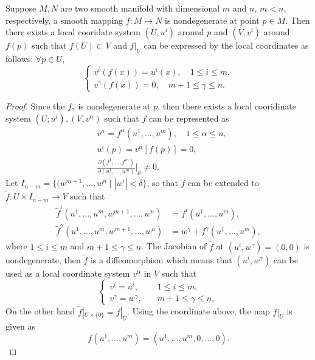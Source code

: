 \begin{theorem}
Suppose $M,N$ are two smooth manifold with dimensional $m$ and $n$, $m<n$, respectively, a smooth mapping $f:M\to N$ is nondegenerate at point $p\in M$. Then there exists a local cooridate system $(U,u^i)$ around $p$ and $(V,v^i)$ around $f(p)$ such that $f(U)\subset V$ and $f|_U$ can be expressed by the local coordinates as follows: $\forall p \in U$,
\begin{equation}
\left\{
\begin{array}{l}
v^i(f(x))=u^i(x),\quad 1\le i\le m,\\
v^\gamma(f(x))=0, \quad m+1\le \gamma\le n.
\end{array}
\right.
\end{equation}
\end{theorem}\label{theorem:imbedding_local_cooridnate_system}

\begin{proof}
Since the $f_*$ is nondegenerate at $p$, then there exists a local cooridinate system $(U;u^i),(V,v^\alpha)$ such that $f$ can be represented as
\begin{equation}
\begin{aligned}
&v^\alpha=f^\alpha(u^1,\dots,u^m), \quad 1\le \alpha\le n,\\
&u^i(p)=v^\alpha[f(p)]=0,\\
&\frac{\partial(f^1,\dots,f^m)}{\partial(u^1,\dots,u^m)}\bigg|_p\ne 0.
\end{aligned}
\end{equation}
Let $I_{n-m}=\{(w^{m+1},\dots,w^{n}\mid|w^i|<\delta\}$, so that $f$ can be extended to $\tilde f:U\times I_{n-m}\to V$ such that
\begin{equation*}
\begin{aligned}
\tilde f^i(u^1,\dots,u^m,w^{m+1},\dots,w^n)&=f^i(u^1,\dots,u^m),\\
\tilde f^\gamma(u^1,\dots,u^m,w^{m+1},\dots,w^n)&=w^\gamma+f^\gamma(u^1,\dots,u^m),
\end{aligned}
\end{equation*}
where $1\le i\le m$ and $m+1\le\gamma\le n$. 
The Jacobian of $\tilde f$ at $(u^i,w^\gamma)=(0,0)$ is nondegenerate, then $\tilde f$ is a diffeomorphism which means that $(u^i,w^\gamma)$ can be used as a local coordinate system $v^\alpha$ in $V$ such that 
\begin{equation*}
\left\{
\begin{aligned}
v^i=u^i,&\quad 1\le i\le m,\\
v^\gamma = w^\gamma, &\quad m+1\le\gamma\le n,
\end{aligned}\right.
\end{equation*}
On the other hand $\tilde f|_{U\times\{0\}}=f|_U$. Using the coordinate above, the map $f|_U$ is given as
\begin{equation}
f(u^1,\dots, u^m)=(u^1,\dots, u^m,0,\dots, 0).
\end{equation} 
\end{proof}

